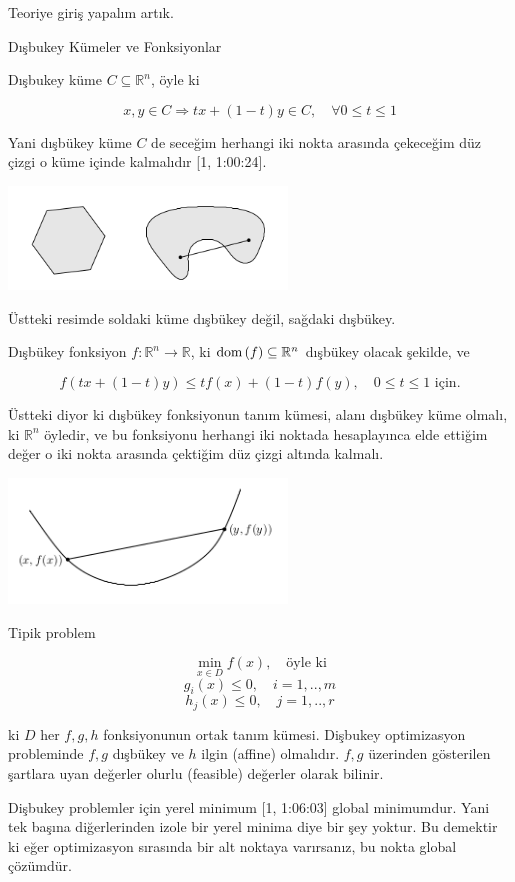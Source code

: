 \documentclass[12pt,fleqn]{article}\usepackage{../../common}
\begin{document}
Teoriye giriş yapalım artık. 

Dışbukey Kümeler ve Fonksiyonlar

Dışbukey küme $C \subseteq \mathbb{R}^n$, öyle ki 

$$
x,y \in C \Rightarrow tx + (1-t) y \in C, \quad \forall 0 \le t \le 1
$$

Yani dışbükey küme $C$ de seceğim herhangi iki nokta arasında çekeceğim düz
çizgi o küme içinde kalmalıdır [1, 1:00:24]. 

\includegraphics[width=20em]{func_19_intro_04.png}

Üstteki resimde soldaki küme dışbükey değil, sağdaki dışbükey.

Dışbükey fonksiyon $f: \mathbb{R}^n \to \mathbb{R}$, ki
$\operatorname{dom}{(f)} \subseteq \mathbb{R}^n$ dışbükey olacak şekilde, ve 

$$
f( tx + (1-t) y ) \le t f(x) + (1-t) f(y), \quad 0 \le t \le 1 \textrm{ için.} 
$$

Üstteki diyor ki dışbükey fonksiyonun tanım kümesi, alanı dışbükey küme
olmalı, ki $\mathbb{R}^n$ öyledir, ve bu fonksiyonu herhangi iki noktada
hesaplayınca elde ettiğim değer o iki nokta arasında çektiğim düz çizgi
altında kalmalı. 

\includegraphics[width=20em]{func_19_intro_05.png}

Tipik problem 

$$
\min_{x \in D} f(x), \quad \textrm{öyle ki}
$$
$$
g_i(x) \le 0, \quad i=1,..,m
$$
$$
h_j(x) \le 0, \quad j=1,..,r
$$

ki $D$ her $f,g,h$ fonksiyonunun ortak tanım kümesi. Dişbukey optimizasyon
probleminde $f,g$ dışbükey ve $h$ ilgin (affine) olmalıdır. $f,g$ üzerinden
gösterilen şartlara uyan değerler olurlu (feasible) değerler olarak
bilinir.

Dişbukey problemler için yerel minimum [1, 1:06:03] global minimumdur. Yani
tek başına diğerlerinden izole bir yerel minima diye bir şey yoktur. Bu
demektir ki eğer optimizasyon sırasında bir alt noktaya varırsanız, bu
nokta global çözümdür. 
\end{document}
